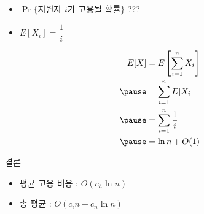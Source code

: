\documentclass[10pt]{beamer}
\begin{document}
\begin{frame}{}
    \begin{itemize}
        \item $\Pr\{\mbox{지원자 $i$가 고용될 확률}\}$ ???
        \pause
        \item $E[X_i] = \dfrac{1}{i}$
        \pause
    \end{itemize}

    \[
        \begin{aligned}  
          E[X] &= E \left[  \sum_{i=1}^n X_i  \right] \\ \pause
          &= \sum_{i=1}^n E[X_i] \\ \pause
          &= \sum_{i=1}^n \dfrac{1}{i} \\ \pause
          &= \ln n + O(1)
        \end{aligned}
    \]
\end{frame}



\begin{frame}{결론}
    \begin{itemize}
        \item 평균 고용 비용 : $O(c_h \ln n)$
        \item 총 평균 : $O(c_in + c_n \ln n)$
    \end{itemize}

\end{frame}









\end{document}

